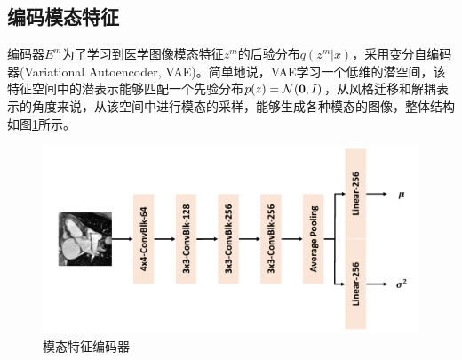 \subsection{编码模态特征}
编码器$E^m$为了学习到医学图像模态特征$z^m$的后验分布$q(z^m|x)$，采用变分自编码器\cite{kingma2013auto}(Variational Autoencoder, VAE)。简单地说，VAE学习一个低维的潜空间，该特征空间中的潜表示能够匹配一个先验分布$p(z)=\mathcal{N}(\bold{0},I)$，从风格迁移和解耦表示的角度来说，从该空间中进行模态的采样，能够生成各种模态的图像，整体结构如图\ref{fig:enc_modality}所示。
\begin{figure}
    \centering
    \includegraphics[width=\textwidth]{image/chap03/encoder_modality.pdf}
    \caption{模态特征编码器}
    \label{fig:enc_modality}
\end{figure}

